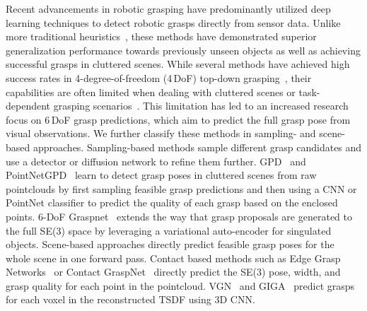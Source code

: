 \documentclass[letterpaper, 10 pt, conference]{ieeeconf}  %
\begin{document}
Recent advancements in robotic grasping have predominantly utilized deep learning techniques to detect robotic grasps directly from sensor data. Unlike more traditional heuristics~\cite{Newbury2022DeepLA}, these methods have demonstrated superior generalization performance towards previously unseen objects as well as achieving successful grasps in cluttered scenes.
%
While several methods have achieved high success rates in 4-degree-of-freedom (4\,DoF) top-down grasping~\cite{mahler2017dex,9926708}, their capabilities are often limited when dealing with cluttered scenes or task-dependent grasping scenarios~\cite{Mousavian_2019_ICCV}.
This limitation has led to an increased research focus on 6\,DoF grasp predictions, which aim to predict the full grasp pose from visual observations.
We further classify these methods in sampling- and scene-based approaches.
Sampling-based methods sample different grasp candidates and use a detector or diffusion \cite{weng2023neural, urain2023se} network to refine them further. GPD~\cite{Gualtieri2016HighPG} and PointNetGPD~\cite{liang2019pointnetgpd} learn to detect grasp poses in cluttered scenes from raw pointclouds by first sampling feasible grasp predictions and then using a CNN or PointNet classifier to predict the quality of each grasp based on the enclosed points.
6-DoF Graspnet~\cite{Mousavian_2019_ICCV} extends the way that grasp proposals are generated to the full SE(3) space by leveraging a variational auto-encoder for singulated objects.
Scene-based approaches directly predict feasible grasp poses for the whole scene in one forward pass.
Contact based methods such as Edge Grasp Networks~\cite{huang2022edge} or Contact GraspNet~\cite{Sundermeyer2021ContactGraspNetE6} directly predict the SE(3) pose, width, and grasp quality for each point in the pointcloud.
VGN~\cite{Breyer2021VolumetricGN} and GIGA~\cite{Jiang2021SynergiesBA} predict grasps for each voxel in the reconstructed TSDF using 3D CNN.
\end{document}
